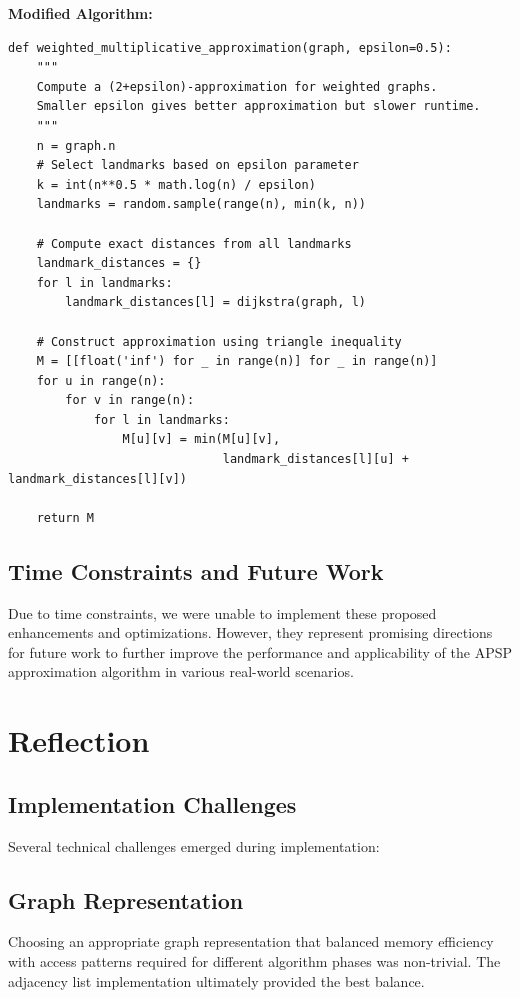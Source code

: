 \documentclass[a4paper,11pt,oneside]{book}
\begin{document}
\textbf{Modified Algorithm:}
\begin{verbatim}
def weighted_multiplicative_approximation(graph, epsilon=0.5):
    """
    Compute a (2+epsilon)-approximation for weighted graphs.
    Smaller epsilon gives better approximation but slower runtime.
    """
    n = graph.n
    # Select landmarks based on epsilon parameter
    k = int(n**0.5 * math.log(n) / epsilon)
    landmarks = random.sample(range(n), min(k, n))
    
    # Compute exact distances from all landmarks
    landmark_distances = {}
    for l in landmarks:
        landmark_distances[l] = dijkstra(graph, l)
    
    # Construct approximation using triangle inequality
    M = [[float('inf') for _ in range(n)] for _ in range(n)]
    for u in range(n):
        for v in range(n):
            for l in landmarks:
                M[u][v] = min(M[u][v], 
                              landmark_distances[l][u] + landmark_distances[l][v])
    
    return M
\end{verbatim}

\subsection{Time Constraints and Future Work}
Due to time constraints, we were unable to implement these proposed enhancements and optimizations. However, they represent promising directions for future work to further improve the performance and applicability of the APSP approximation algorithm in various real-world scenarios.

\section{Reflection}

\subsection{Implementation Challenges}
Several technical challenges emerged during implementation:

\subsection{Graph Representation}
Choosing an appropriate graph representation that balanced memory efficiency with access patterns required for different algorithm phases was non-trivial. The adjacency list implementation ultimately provided the best balance.
\end{document}
